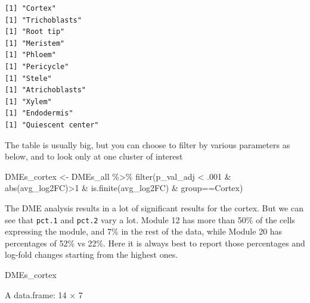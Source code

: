 \documentclass[
  letterpaper,
  DIV=11,
  numbers=noendperiod]{scrartcl}
\newenvironment{Shaded}{\begin{snugshade}}{\end{snugshade}}
\newcommand{\DecValTok}[1]{\textcolor[rgb]{0.25,0.63,0.44}{#1}}
\newcommand{\FunctionTok}[1]{\textcolor[rgb]{0.02,0.16,0.49}{#1}}
\newcommand{\NormalTok}[1]{\textcolor[rgb]{0.00,0.44,0.13}{#1}}
\newcommand{\OtherTok}[1]{\textcolor[rgb]{0.00,0.44,0.13}{#1}}
\newcommand{\SpecialCharTok}[1]{\textcolor[rgb]{0.25,0.44,0.63}{#1}}
\newcommand{\StringTok}[1]{\textcolor[rgb]{0.25,0.44,0.63}{#1}}
\begin{document}
\begin{verbatim}
[1] "Cortex"
[1] "Trichoblasts"
[1] "Root tip"
[1] "Meristem"
[1] "Phloem"
[1] "Pericycle"
[1] "Stele"
[1] "Atrichoblasts"
[1] "Xylem"
[1] "Endodermis"
[1] "Quiescent center"
\end{verbatim}

The table is usually big, but you can choose to filter by various
parameters as below, and to look only at one cluster of interest

\begin{Shaded}
\begin{Highlighting}[]
\NormalTok{DMEs\_cortex }\OtherTok{\textless{}{-}}\NormalTok{ DMEs\_all }\SpecialCharTok{\%\textgreater{}\%} \FunctionTok{filter}\NormalTok{(p\_val\_adj }\SpecialCharTok{\textless{}}\NormalTok{ .}\DecValTok{001} \SpecialCharTok{\&} \FunctionTok{abs}\NormalTok{(avg\_log2FC)}\SpecialCharTok{\textgreater{}}\DecValTok{1} 
                                       \SpecialCharTok{\&} \FunctionTok{is.finite}\NormalTok{(avg\_log2FC)}
                                       \SpecialCharTok{\&}\NormalTok{ group}\SpecialCharTok{==}\StringTok{\textquotesingle{}Cortex\textquotesingle{}}\NormalTok{)}
\end{Highlighting}
\end{Shaded}

The DME analysis results in a lot of significant results for the cortex.
But we can see that \texttt{pct.1} and \texttt{pct.2} vary a lot. Module
12 has more than 50\% of the cells expressing the module, and 7\% in the
rest of the data, while Module 20 has percentages of 52\% vs 22\%. Here
it is always best to report those percentages and log-fold changes
starting from the highest ones.

\begin{Shaded}
\begin{Highlighting}[]
\NormalTok{DMEs\_cortex}
\end{Highlighting}
\end{Shaded}

A data.frame: 14 × 7
\end{document}
